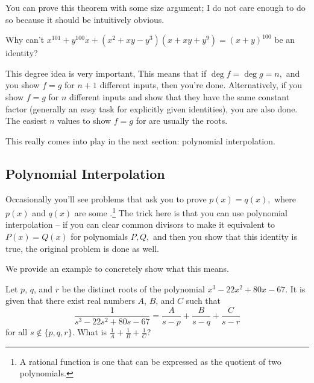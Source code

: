 \documentclass{article}
\begin{document}
You can prove this theorem with some size argument; I do not care enough to do so because it should be intuitively obvious.

\begin{exer}
Why can't $x^{101}+y^{100}x+(x^2+xy-y^3)(x+xy+y^9)=(x+y)^{100}$ be an identity?
\end{exer}

This degree idea is very important,  This means that if $\deg f=\deg g = n,$ and you show $f=g$ for $n+1$ different inputs, then you're done. Alternatively, if you show $f=g$ for $n$ different inputs and show that they have the same constant factor (generally an easy task for explicitly given identities), you are also done. The easiest $n$ values to show $f=g$ for are usually the roots.

This really comes into play in the next section: polynomial interpolation.

\subsection{Polynomial Interpolation}

Occasionally you'll see problems that ask you to prove $p(x)=q(x),$ where $p(x)$ and $q(x)$ are some .\footnote{A rational function is one that can be expressed as the quotient of two polynomials.} The trick here is that you can use polynomial interpolation -- if you can clear common divisors to make it equivalent to $P(x)=Q(x)$ for polynomials $P,Q,$ and then you show that this identity is true, the original problem is done as well.

We provide an example to concretely show what this means.

\begin{exam}[AMC 10A 2019/24]
Let $p$, $q$, and $r$ be the distinct roots of the polynomial $x^3 - 22x^2 + 80x - 67$. It is given that there exist real numbers $A$, $B$, and $C$ such that\[\dfrac{1}{s^3 - 22s^2 + 80s - 67} = \dfrac{A}{s-p} + \dfrac{B}{s-q} + \frac{C}{s-r}\]for all $s\not\in\{p,q,r\}$. What is $\tfrac1A+\tfrac1B+\tfrac1C$?
\end{exam}
\end{document}
